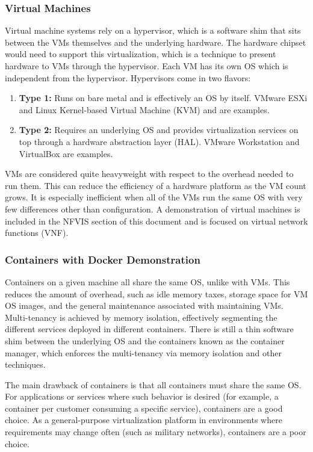 \subsubsection{Virtual Machines}
Virtual machine systems rely on a hypervisor, which is a software shim that
sits between the VMs themselves and the underlying hardware. The hardware
chipset would need to support this virtualization, which is a technique to
present hardware to VMs through the hypervisor. Each VM has its own OS which
is independent from the hypervisor. Hypervisors come in two flavors:

\begin{enumerate}
  \item \textbf{Type 1:} Runs on bare metal and is effectively an OS by
  itself. VMware ESXi and Linux Kernel-based  Virtual Machine (KVM) and are
  examples.
  \item \textbf{Type 2:} Requires an underlying OS and provides virtualization
  services on top through a hardware abstraction layer (HAL). VMware
  Workstation and VirtualBox are examples.
\end{enumerate}

VMs are considered quite heavyweight with respect to the overhead needed to
run them. This can reduce the efficiency of a hardware platform as the VM
count grows. It is especially inefficient when all of the VMs run the same OS
with very few differences other than configuration. A demonstration of
virtual machines is included in the NFVIS section of this document and is
focused on virtual network functions (VNF).

\subsubsection{Containers with Docker Demonstration}
Containers on a given machine all share the same OS, unlike with VMs. This
reduces the amount of overhead, such as idle memory taxes, storage space for
VM OS images, and the general maintenance associated with maintaining VMs.
Multi-tenancy is achieved by memory isolation, effectively segmenting the
different services deployed in different containers. There is still a thin
software shim between the underlying OS and the containers known as the
container manager, which enforces the multi-tenancy via memory isolation and
other techniques.

The main drawback of containers is that all containers must share the same OS\@.
For applications or services where such behavior is desired (for example, a
container per customer consuming a specific service), containers are a good
choice. As a general-purpose virtualization platform in environments where
requirements may change often (such as military networks), containers are a
poor choice.

